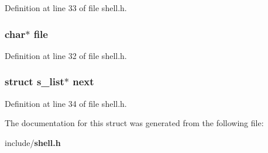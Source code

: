 Definition at line 33 of file shell.\-h.

\subsubsection[{file}]{\setlength{\rightskip}{0pt plus 5cm}char$\ast$ file}\label{structs__list_adf16cd437526a5c5e0e0af87745acbb8}


Definition at line 32 of file shell.\-h.

\subsubsection[{next}]{\setlength{\rightskip}{0pt plus 5cm}struct {\bf s\-\_\-list}$\ast$ next}\label{structs__list_a4bcaaa089cc834cf70b73bafa9af1e05}


Definition at line 34 of file shell.\-h.



The documentation for this struct was generated from the following file\-:\begin{DoxyCompactItemize}
\item 
include/{\bf shell.\-h}\end{DoxyCompactItemize}
